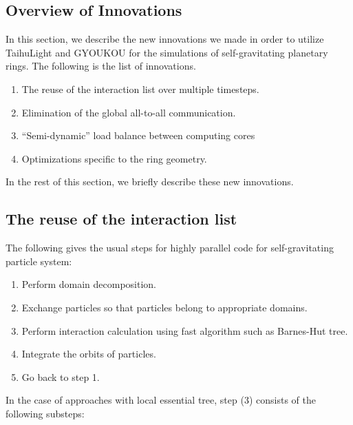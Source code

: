 \documentclass[conference]{IEEEtran}
\begin{document}
  \subsection{Overview of Innovations}

  
In this section, we describe the new innovations we made in order to
utilize TaihuLight and GYOUKOU for the simulations of self-gravitating
planetary rings. The following is the list of innovations.


\begin{enumerate}
\item The reuse of the interaction list over multiple timesteps.
\item Elimination of  the global all-to-all communication.
\item ``Semi-dynamic'' load balance between computing cores
\item Optimizations specific to the ring geometry.
\end{enumerate}  

In the rest of this section, we briefly describe these new innovations.

\subsection{The reuse of the interaction list}
\label{subsec:list}


The following gives the usual steps for highly parallel code for
self-gravitating particle system:

\begin{enumerate}

  \item Perform domain decomposition.
  \item Exchange particles so that particles belong to appropriate domains.
  \item Perform interaction calculation using fast algorithm such as
    Barnes-Hut tree.
  \item Integrate the orbits of particles.
  \item Go back to step 1.

\end{enumerate}

In the case of approaches with local essential tree, step (3) consists
of the following substeps:
\end{document}
